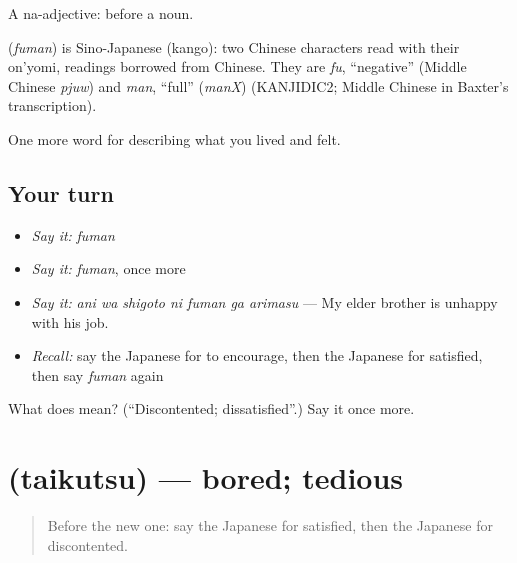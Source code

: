 A na-adjective:  before a noun.

\begin{cousinweb}
\textbf{} (\emph{fuman}) is Sino-Japanese (kango): two Chinese characters read with their on'yomi, readings borrowed from Chinese. They are \emph{fu}, \textquotedblleft{}negative\textquotedblright{} (Middle Chinese \emph{pjuw}) and \emph{man}, \textquotedblleft{}full\textquotedblright{} (\emph{manX}) (KANJIDIC2; Middle Chinese in Baxter's transcription).
\end{cousinweb}

\begin{grammarlens}[title={What you've built}]
One more word for describing what you lived and felt.
\end{grammarlens}

\subsection*{Your turn}
\begin{itemize}
\raggedright
  \item \emph{Say it:} \emph{fuman}
  \item \emph{Say it:} \emph{fuman}, once more
  \item \emph{Say it:} \emph{ani wa shigoto ni fuman ga arimasu} — My elder brother is unhappy with his job.
  \item \emph{Recall:} say the Japanese for to encourage, then the Japanese for satisfied, then say \emph{fuman} again
\end{itemize}

\begin{tcolorbox}[breakable,colback=teal!4,colframe=teal!35!black,title={Before you move on}]
What does  mean? (\textquotedblleft{}Discontented; dissatisfied\textquotedblright{}.) Say it once more.
\end{tcolorbox}
\section[\texorpdfstring{\ja{たいくつ} (taikutsu)}{たいくつ (taikutsu)}]{ (taikutsu) — bored; tedious}

\label{lesson:JA-C435-taikutsu}



\begin{quote}
Before the new one: say the Japanese for satisfied, then the Japanese for discontented.
\end{quote}

